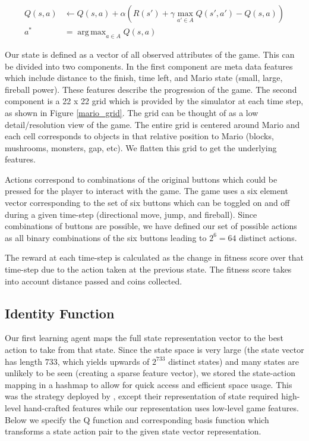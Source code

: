 \documentclass[12pt]{article}
\DeclareMathOperator*{\argmax}{arg\,max}
\begin{document}
\begin{align*}
Q(s,a) &\leftarrow Q(s,a) + \alpha (R(s') + \gamma \max_{a' \in A} Q(s',a') - Q(s,a))\\
a^* &= \argmax_{a \in A} Q(s,a)
\end{align*}

Our state is defined as a vector of all observed attributes of the game. This can be divided into two components. In the first component are meta data features which include distance to the finish, time left, and Mario state (small, large, fireball power). These features describe the progression of the game. The second component is a 22 x 22 grid which is provided by the simulator at each time step, as shown in Figure \ref{mario_grid}. The grid can be thought of as a low detail/resolution view of the game. The entire grid is centered around Mario and each cell corresponds to objects in that relative position to Mario (blocks, mushrooms, monsters, gap, etc). We flatten this grid to get the underlying features.

Actions correspond to combinations of the original buttons which could be pressed for the player to interact with the game. The game uses a six element vector corresponding to the set of six buttons which can be toggled on and off during a given time-step (directional move, jump, and fireball). Since combinations of buttons are possible, we have defined our set of possible actions as all binary combinations of the six buttons leading to $2^6 = 64$ distinct actions.

The reward at each time-step is calculated as the change in fitness score over that time-step due to the action taken at the previous state. The fitness score takes into account distance passed and coins collected.

\subsection{Identity Function}

Our first learning agent maps the full state representation vector to the best action to take from that state. Since the state space is very large (the state vector has length $733$, which yields upwards of $2^{733}$ distinct states) and many states are unlikely to be seen (creating a sparse feature vector), we stored the state-action mapping in a hashmap to allow for quick access and efficient space usage. This was the strategy deployed by \cite{liao2012cs229}, except their representation of state required high-level hand-crafted features while our representation uses low-level game features. Below we specify the Q function and corresponding basis function which transforms a state action pair to the given state vector representation.
\end{document}
